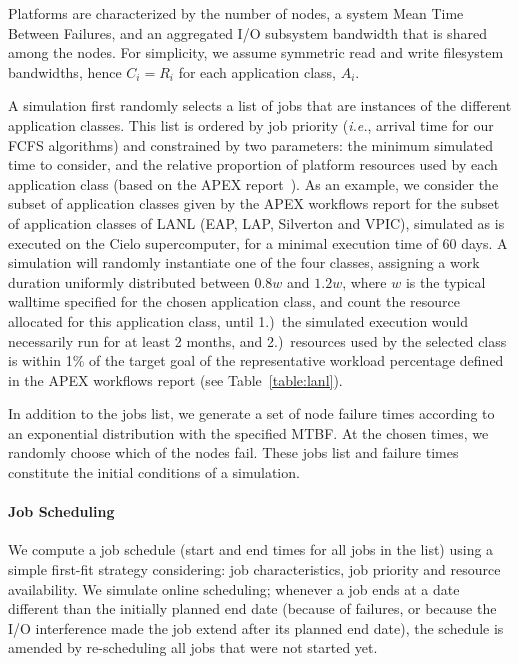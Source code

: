 \documentclass[two]{article}
\newcommand{\ie}[0]{\emph{i.e.}\xspace}
\newcommand{\app}[1]{A_{#1}}
\newcommand{\ckpt}[1]{C_{#1}}
\newcommand{\reco}[1]{R_{#1}}
\begin{document}
Platforms are characterized by the number of nodes, a system Mean Time
Between Failures, and an aggregated I/O subsystem bandwidth that is shared among the
nodes. For simplicity, we assume symmetric read and write filesystem bandwidths, hence
$\ckpt{i}=\reco{i}$ for each application class, $\app{i}$.

A simulation first randomly selects a list of jobs that are instances
of the different application classes. This list is ordered by job
priority (\ie, arrival time for our FCFS algorithms) and constrained
by two parameters: the minimum simulated time to consider, and the
relative proportion of platform resources used by each application
class (based on the APEX report~\cite{apex2016}).  As an example, we
consider the subset of application classes given by the APEX workflows
report for the subset of application classes of LANL (EAP, LAP,
Silverton and VPIC), simulated as is executed on the Cielo
supercomputer, for a minimal execution time of 60 days. A simulation
will randomly instantiate one of the four classes, assigning a work
duration uniformly distributed between $0.8w$ and $1.2w$, where $w$ is
the typical walltime specified for the chosen application class, and
count the resource allocated for this application class, until 1.)~the
simulated execution would necessarily run for at least 2 months, and
2.)~resources used by the selected class is within 1\% of the target
goal of the representative workload percentage defined in the APEX
workflows report (see Table~\ref{table:lanl}).

In addition to the jobs list, we generate a set of node failure times according to an
exponential distribution with the specified MTBF. At the chosen times, we randomly
choose which of the nodes fail.  These jobs list and failure times constitute
the initial conditions of a simulation.

\paragraph*{Job Scheduling}

We compute a job schedule (start and end times for all jobs in the list) using
a simple first-fit strategy considering: job characteristics, job priority and
resource availability.  We simulate online scheduling; whenever a job
ends at a date different than the initially planned end date (because of
failures, or because the I/O interference made the job extend after
its planned end date), the schedule is amended by re-scheduling all
jobs that were not started yet.
\end{document}
